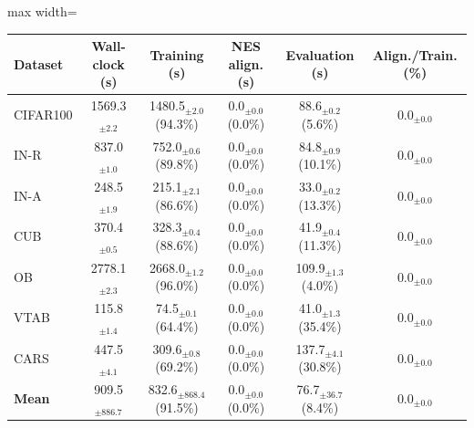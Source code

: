 \renewcommand{\arraystretch}{0.95}
\begin{adjustbox}{max width=\textwidth}
\footnotesize
\begin{tabular}{l c c c c c}
\toprule
\textbf{Dataset} & \textbf{Wall-clock (s)} & \textbf{Training (s)} & \textbf{NES align. (s)} & \textbf{Evaluation (s)} & \textbf{Align./Train. (\%)} \\
\midrule
CIFAR100 & 1569.3$_{\pm 2.2}$ & 1480.5$_{\pm 2.0}$ (94.3\%) & 0.0$_{\pm 0.0}$ (0.0\%) & 88.6$_{\pm 0.2}$ (5.6\%) & 0.0$_{\pm 0.0}$ \\
IN-R & 837.0$_{\pm 1.0}$ & 752.0$_{\pm 0.6}$ (89.8\%) & 0.0$_{\pm 0.0}$ (0.0\%) & 84.8$_{\pm 0.9}$ (10.1\%) & 0.0$_{\pm 0.0}$ \\
IN-A & 248.5$_{\pm 1.9}$ & 215.1$_{\pm 2.1}$ (86.6\%) & 0.0$_{\pm 0.0}$ (0.0\%) & 33.0$_{\pm 0.2}$ (13.3\%) & 0.0$_{\pm 0.0}$ \\
CUB & 370.4$_{\pm 0.5}$ & 328.3$_{\pm 0.4}$ (88.6\%) & 0.0$_{\pm 0.0}$ (0.0\%) & 41.9$_{\pm 0.4}$ (11.3\%) & 0.0$_{\pm 0.0}$ \\
OB & 2778.1$_{\pm 2.3}$ & 2668.0$_{\pm 1.2}$ (96.0\%) & 0.0$_{\pm 0.0}$ (0.0\%) & 109.9$_{\pm 1.3}$ (4.0\%) & 0.0$_{\pm 0.0}$ \\
VTAB & 115.8$_{\pm 1.4}$ & 74.5$_{\pm 0.1}$ (64.4\%) & 0.0$_{\pm 0.0}$ (0.0\%) & 41.0$_{\pm 1.3}$ (35.4\%) & 0.0$_{\pm 0.0}$ \\
CARS & 447.5$_{\pm 4.1}$ & 309.6$_{\pm 0.8}$ (69.2\%) & 0.0$_{\pm 0.0}$ (0.0\%) & 137.7$_{\pm 4.1}$ (30.8\%) & 0.0$_{\pm 0.0}$ \\
\midrule
\textbf{Mean} & 909.5$_{\pm 886.7}$ & 832.6$_{\pm 868.4}$ (91.5\%) & 0.0$_{\pm 0.0}$ (0.0\%) & 76.7$_{\pm 36.7}$ (8.4\%) & 0.0$_{\pm 0.0}$ \\
\bottomrule
\end{tabular}
\end{adjustbox}